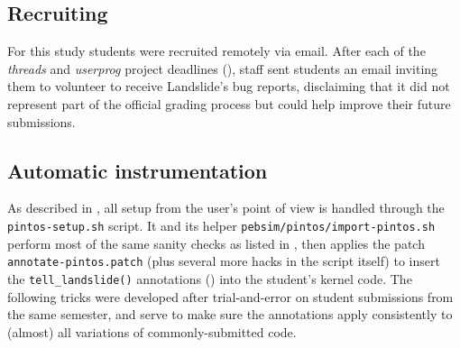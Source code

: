 \subsection{Recruiting}

For this study students were recruited remotely via email.
After each of the {\em threads} and {\em userprog} project deadlines (\sect{\ref{sec:overview-pintos}}),
\uchos staff sent students an email inviting them to volunteer to receive Landslide's bug reports,
disclaiming that it did not represent part of the official grading process but could help improve their future submissions.

\subsection{Automatic instrumentation}
\label{sec:education-pintos-instrumentation}

As described in \sect{\ref{sec:landslide-setup}},
all setup from the user's point of view is handled through the {\tt pintos-setup.sh} script.
It
and its helper {\tt pebsim/pintos/import-pintos.sh}
perform most of the same sanity checks as listed in \sect{\ref{sec:education-pebbles-instrumentation}},
then applies the patch {\tt annotate-\allowbreak{}pintos.patch}
(plus several more hacks in the script itself)
to insert the {\tt tell\_landslide()} annotations (\sect{\ref{sec:tell-landslide}})
into the student's kernel code.
The following tricks were developed after trial-and-error on student submissions from the same semester,
and serve to make sure the annotations apply consistently
to (almost) all variations of commonly-submitted code.

